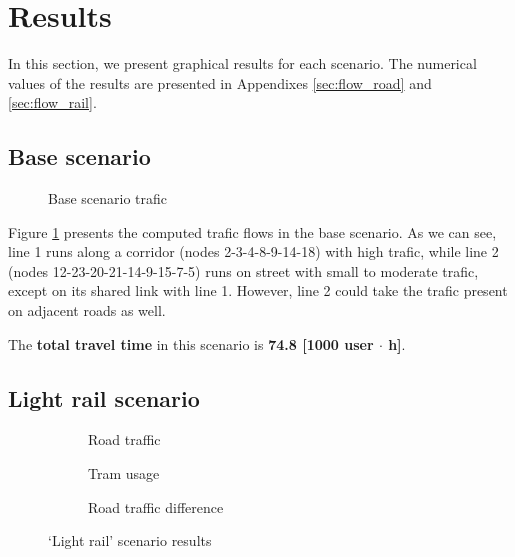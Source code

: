 \section{Results}

In this section, we present graphical results for each scenario. The numerical values of the results are presented in Appendixes \ref{sec:flow_road} and \ref{sec:flow_rail}.

\subsection{Base scenario}

\begin{figure}
    \centering
    \resizebox{0.33\textwidth}{!}{}
    \caption{Base scenario trafic}
    \label{fig:base_scenario}
\end{figure}

Figure \ref{fig:base_scenario} presents the computed trafic flows in the base scenario. As we can see, line 1  runs along a corridor (nodes 2-3-4-8-9-14-18) with high trafic, while line 2 (nodes 12-23-20-21-14-9-15-7-5) runs on street with small to moderate trafic, except on its shared link with line 1. However, line 2 could take the trafic present on adjacent roads as well.

The \textbf{total travel time} in this scenario is \textbf{74.8 [1000 user $\cdot$ h]}.

\subsection{Light rail scenario}

\begin{figure}
    \centering
    \begin{subfigure}{0.33\textwidth}
        \centering
        \resizebox{\textwidth}{!}{}
        \caption{Road traffic}
    \end{subfigure}%
    \begin{subfigure}{0.33\textwidth}
        \centering
        \resizebox{\textwidth}{!}{}
        \caption{Tram usage}
        \label{fig:tram_sc2}
    \end{subfigure}%
    \begin{subfigure}{0.33\textwidth}
        \centering
        \resizebox{\textwidth}{!}{}
        \caption{Road traffic difference}
        \label{fig:diff_sc2}
    \end{subfigure}
    \caption{`Light rail' scenario results}
    \label{fig:lightrail_scenario}
\end{figure}

